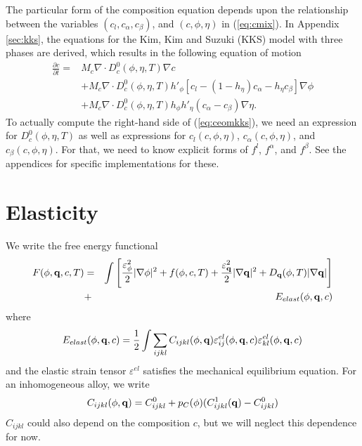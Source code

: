 The particular form of the composition equation depends upon the
relationship between the variables $(c_l,c_\alpha,c_\beta)$, and
$(c,\phi,\eta)$ in (\ref{eq:cmix}).  In Appendix \ref{sec:kks}, the
equations for the Kim, Kim and Suzuki (KKS) model with three phases
are derived, which results in the following equation of motion
%
\begin{equation}
\begin{split}
  \frac{\partial c}{\partial t} = {}
  & M_c \nabla \cdot D_c^0(\phi,\eta,T) \nabla c
  \\ &
    + M_c \nabla \cdot D_c^0(\phi,\eta,T) h'_\phi \left[
    c_l - ( 1 - h_\eta ) c_\alpha - h_\eta c_\beta \right]
    \nabla \phi
  \\ &
    + M_c \nabla \cdot D_c^0(\phi,\eta,T) h_\phi h'_\eta
    ( c_\alpha - c_\beta ) \nabla \eta.
\label{eq:ceomkks}
\end{split}
\end{equation}
%
To actually compute the right-hand side of (\ref{eq:ceomkks}), we need
an expression for $D_c^0(\phi,\eta,T)$ as well as expressions for
$c_l(c,\phi,\eta)$, $c_\alpha(c,\phi,\eta)$, and
$c_\beta(c,\phi,\eta)$.  For that, we need to know explicit forms of
$f^l$, $f^\alpha$, and $f^\beta$.  See the appendices for specific
implementations for these.


%
\section{Elasticity}

We write the free energy functional
%
\begin{eqnarray}
  \nonumber
  F(\phi,{\bf q},c,T) &=& \int \left[\frac{\varepsilon_{\phi}^2}{2} |\nabla \phi |^2 + f(\phi,c,T) +
      \frac{\varepsilon_{\bf q}^2}{2} |\nabla {\bf q} |^2 +
      D_{\bf q}(\phi,T) |\nabla {\bf q} | \right] \\
  &+&  E_{elast}(\phi,{\bf q},c)
\end{eqnarray}
%
where
%
\begin{equation}\label{eq:eelast}
  E_{elast}(\phi,{\bf q},c) =
  \frac{1}{2}\int \sum_{ijkl} C_{ijkl}(\phi,{\bf q})
  \varepsilon^{el}_{ij}(\phi,{\bf q},c)\varepsilon^{el}_{kl}(\phi,{\bf q},c)
\end{equation}
%
and the elastic strain tensor $\varepsilon^{el}$ satisfies the
mechanical equilibrium equation.  For an inhomogeneous alloy, we write
%
\begin{equation}
  C_{ijkl}(\phi,{\bf q})
  =C_{ijkl}^0+p_C(\phi) (C_{ijkl}^1({\bf q})-C_{ijkl}^0)
\end{equation}
%
$C_{ijkl}$ could also depend on the composition $c$, but we will
neglect this dependence for now.

